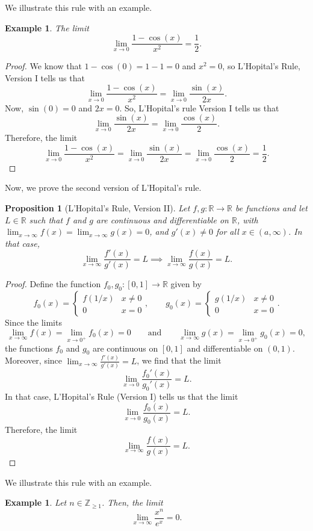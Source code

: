 \documentclass[a4paper, openany]{memoir}
\theoremstyle{definition}
\theoremstyle{plain}
\newtheorem{proposition}[definition]{Proposition}
\newtheorem{example}[definition]{Example}
\begin{document}
\noindent We illustrate this rule with an example.
\begin{example}
The limit
\[\lim_{x \to 0} \frac{1 - \cos (x)}{x^2} = \frac{1}{2}.\]
\end{example}
\begin{proof}
We know that $1 - \cos(0) = 1 - 1 = 0$ and $x^2 = 0$, so L'Hopital's Rule, Version I tells us that
\[\lim_{x \to 0} \frac{1 - \cos (x)}{x^2} = \lim_{x \to 0} \frac{\sin (x)}{2x}.\]
Now, $\sin (0) = 0$ and $2x = 0$. So, L'Hopital's rule Version I tells us that
\[\lim_{x \to 0} \frac{\sin (x)}{2x} = \lim_{x \to 0} \frac{\cos (x)}{2}.\]
Therefore, the limit
\[\lim_{x \to 0} \frac{1 - \cos (x)}{x^2} = \lim_{x \to 0} \frac{\sin (x)}{2x} = \lim_{x \to 0} \frac{\cos (x)}{2} = \frac{1}{2}.\]
\end{proof}
Now, we prove the second version of L'Hopital's rule.
\begin{proposition}[L'Hopital's Rule, Version II]
Let $f, g: \mathbb{R} \to \mathbb{R}$ be functions and let $L \in \mathbb{R}$ such that $f$ and $g$ are continuous and differentiable on $\mathbb{R}$, with $\lim_{x \to \infty} f(x) = \lim_{x \to \infty} g(x) = 0$, and $g'(x) \neq 0$ for all $x \in (a, \infty)$. In that case,
\[\lim_{x \to \infty} \frac{f'(x)}{g'(x)} = L \implies \lim_{x \to \infty} \frac{f(x)}{g(x)} = L.\]
\end{proposition}
\begin{proof}
Define the function $f_0, g_0: [0, 1] \to \mathbb{R}$ given by
\[f_0(x) = \begin{cases}
f(1/x) & x \neq 0 \\
0 & x = 0
\end{cases}, \qquad g_0(x) = \begin{cases}
g(1/x) & x \neq 0 \\
0 & x = 0
\end{cases}.\]
Since the limits
\[\lim_{x \to \infty} f(x) = \lim_{x \to 0^+} f_0(x) = 0 \qquad \text{and} \qquad \lim_{x \to \infty} g(x) = \lim_{x \to 0^+} g_0(x) = 0,\]
the functions $f_0$ and $g_0$ are continuous on $[0, 1]$ and differentiable on $(0, 1)$. Moreover, since $\lim_{x \to \infty} \frac{f'(x)}{g'(x)} = L$, we find that the limit
\[\lim_{x \to 0} \frac{f_0'(x)}{g_0'(x)} = L.\]
In that case, L'Hopital's Rule (Version I) tells us that the limit
\[\lim_{x \to 0} \frac{f_0(x)}{g_0(x)} = L.\]
Therefore, the limit
\[\lim_{x \to \infty} \frac{f(x)}{g(x)} = L.\]
\end{proof}
\noindent We illustrate this rule with an example.
\begin{example}
Let $n \in \mathbb{Z}_{\geqslant 1}$. Then, the limit
\[\lim_{x \to \infty} \frac{x^n}{e^x} = 0.\]
\end{example}
\end{document}
